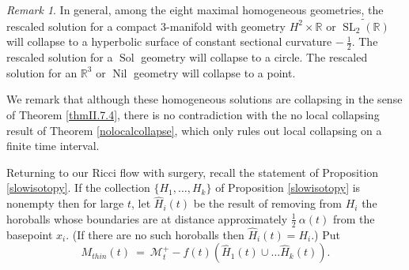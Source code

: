 \documentclass[12pt]{amsart}
\newcommand{\M}{{\mathcal M}}
\newcommand{\Nil}{\operatorname{Nil}}
\newcommand{\R}{{\mathbb R}}
\newcommand{\SL}{\operatorname{SL}}
\newcommand{\Sol}{\operatorname{Sol}}
\numberwithin{equation}{section}
\theoremstyle{plain}
\theoremstyle{definition}
\theoremstyle{remark}
\newtheorem{remark}[equation]{Remark}
\begin{document}
\begin{remark}
In general, among the eight maximal homogeneous geometries, the
rescaled solution for a compact $3$-manifold with geometry 
$H^2 \times \R$ or $\widetilde{\SL_2(\R)}$
will collapse to a hyperbolic surface of constant 
sectional curvature $- \: \frac12$.
The rescaled solution for a $\Sol$ geometry will collapse to a circle.
The rescaled solution for an $\R^3$ or $\Nil$ geometry will collapse to
a point.

We remark that although these homogeneous solutions
are collapsing in the sense of Theorem
\ref{thmII.7.4}, there is no contradiction with the
no local collapsing result of Theorem \ref{nolocalcollapse},
which only rules out
local collapsing on a finite time interval.
\end{remark}

Returning to our Ricci flow with surgery, recall the statement of
Proposition \ref{slowisotopy}. If the collection
$\{H_1,\ldots, H_k\}$ of Proposition \ref{slowisotopy} is nonempty then
for large $t$, let $\widehat{H}_i(t)$ be the result of removing from $H_i$ the horoballs whose
boundaries are at 
distance approximately $\frac12 \: \alpha(t)$ from the basepoint $x_i$.
(If there are no such horoballs then $\widehat{H}_i(t) = H_i$.)
Put
\begin{equation}
M_{thin}(t) \: = \: \M_t^+ - f(t) (\widehat{H}_1(t) \cup \ldots \widehat{H}_k(t)).
\end{equation}
\end{document}
